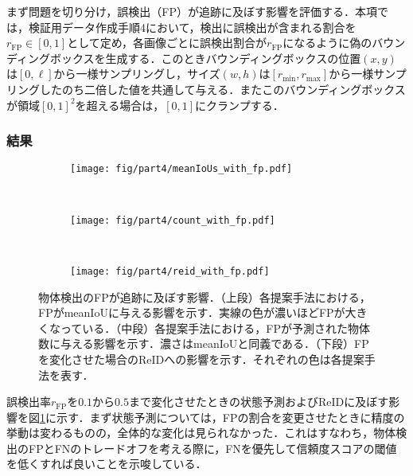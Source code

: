     まず問題を切り分け，誤検出（FP）が追跡に及ぼす影響を評価する．本項では，検証用データ作成手順4において，検出に誤検出が含まれる割合を$r_{\text{FP}} \in [0, 1]$として定め，各画像ごとに誤検出割合が$r_{\text{FP}}$になるように偽のバウンディングボックスを生成する．このときバウンディングボックスの位置$(x,y)$は$[0, \ell]$から一様サンプリングし，サイズ$(w, h)$は$[r_{\text{min}}, r_{\text{max}}]$から一様サンプリングしたのち二倍した値を共通して与える．またこのバウンディングボックスが領域$[0, 1]^2$を超える場合は，$[0, 1]$にクランプする．

        \subsubsection{結果}

        \begin{figure}[t]
            \begin{subfigure}[t]{\linewidth}
                \centering
                \texttt{[image: fig/part4/meanIoUs\_with\_fp.pdf]}
            \end{subfigure}
            \\
            \begin{subfigure}[t]{\linewidth}
                \centering
                \texttt{[image: fig/part4/count\_with\_fp.pdf]}
            \end{subfigure}
            \\
            \begin{subfigure}[t]{\linewidth}
                \centering
                \texttt{[image: fig/part4/reid\_with\_fp.pdf]}
            \end{subfigure}
            \caption[物体検出のFPが追跡に及ぼす影響]{物体検出のFPが追跡に及ぼす影響．（上段）各提案手法における，FPがmeanIoUに与える影響を示す．実線の色が濃いほどFPが大きくなっている．（中段）各提案手法における，FPが予測された物体数に与える影響を示す．濃さはmeanIoUと同義である．（下段）FPを変化させた場合のReIDへの影響を示す．それぞれの色は各提案手法を表す．}
            \label{fig:FP_effect}
        \end{figure}

        誤検出率$r_{\text{FP}}$を$0.1$から$0.5$まで変化させたときの状態予測およびReIDに及ぼす影響を図\ref{fig:FP_effect}に示す．まず状態予測については，FPの割合を変更させたときに精度の挙動は変わるものの，全体的な変化は見られなかった．これはすなわち，物体検出のFPとFNのトレードオフを考える際に，FNを優先して信頼度スコアの閾値を低くすれば良いことを示唆している．

